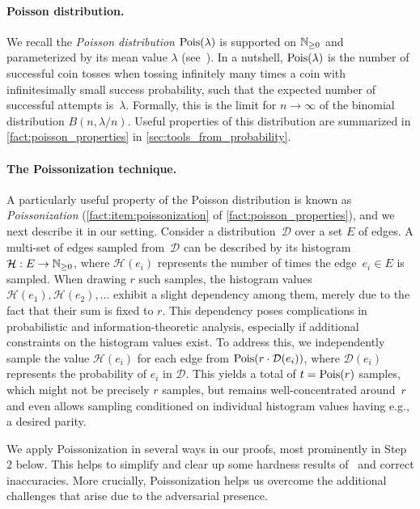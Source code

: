 \documentclass[letter,11pt]{article}
\begin{document}
\paragraph{Poisson distribution.}
We recall the \emph{Poisson distribution} $\poisson{\lambda}$ is supported on $\mathbb{N}_{\geq 0}$ and parameterized by its mean value $\lambda$ (see~\cite[Section~8.4]{books:probability}).
In a nutshell, 
$\poisson{\lambda}$ is the number of successful coin tosses 
when tossing infinitely many times a coin with infinitesimally small success probability, such that the expected number of successful attempts is~$\lambda$. 
Formally, this is the limit for $n \to \infty$
of the binomial distribution 
$B(n, \lambda/n)$.
Useful properties of this distribution are summarized in \cref{fact:poisson_properties} in \cref{sec:tools_from_probability}.


\paragraph{The Poissonization technique.}
A particularly useful property of the Poisson distribution is known as \emph{Poissonization} (\cref{fact:item:poissonization} of \cref{fact:poisson_properties}), and we next describe it in our setting.
Consider a distribution~$\mathcal{D}$ over a set $E$ of edges.
A multi-set of edges sampled from~$\mathcal{D}$ can be described by its histogram $\mathcal{H}:E\to \mathbb{N}_{\geq 0}$, where $\mathcal{H}(e_i)$ represents the number of times the edge~$e_i\in E$ is sampled.
When drawing $r$ such samples, the histogram values $\mathcal{H}(e_1), \mathcal{H}(e_2), \dots$ exhibit a slight dependency among them, merely due to the fact that their sum is fixed to $r$.
This dependency poses complications in probabilistic and information-theoretic analysis, especially
if additional constraints on the histogram values exist.
To address this, we independently sample the value $\mathcal{H}(e_i)$ for each edge from $\poisson{r\cdot \mathcal{D}(e_i)}$, 
where $\mathcal{D}(e_i)$ represents the probability of $e_i$ in $\mathcal{D}$.
This yields a total of $t = \poisson{r}$ samples, which might not be precisely $r$ samples,
but remains well-concentrated around~$r$
and even allows sampling conditioned on individual histogram values having e.g., a desired parity.

We apply Poissonization in several ways in our proofs, most prominently in Step~$2$ below.
This helps to simplify and clear up some hardness results of~\cite{HLS22} and correct inaccuracies.
More crucially, Poissonization helps us overcome the additional challenges that arise due to the adversarial presence.
\end{document}
